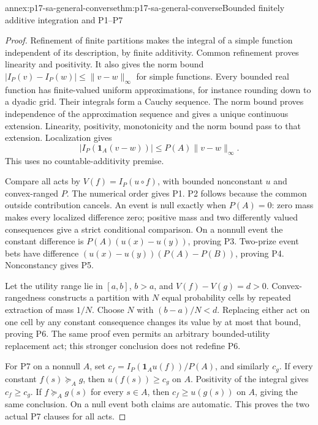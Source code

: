 \begin{annexitem}{annex:p17-sa-general-converse}{thm:p17-sa-general-converse}{Bounded finitely additive integration and P1--P7}
\begin{proof}
Refinement of finite partitions makes the integral of a simple
function independent of its description, by finite additivity.
Common refinement proves linearity and positivity.
It also gives the norm bound
\(|I_P(v)-I_P(w)|\leq\lVert v-w\rVert_\infty\) for simple
functions. Every bounded real function has finite-valued
uniform approximations, for instance rounding down to a
dyadic grid. Their integrals form a Cauchy sequence.
The norm bound proves independence of the approximation
sequence and gives a unique continuous extension.
Linearity, positivity, monotonicity and the norm bound
pass to that extension. Localization gives
\[
 |I_P(\mathbf1_A(v-w))|
 \leq P(A)\lVert v-w\rVert_\infty.
\]
This uses no countable-additivity premise.

Compare all acts by \(V(f)=I_P(u\circ f)\), with
bounded nonconstant \(u\) and convex-ranged \(P\).
The numerical order gives P1.
P2 follows because the common outside contribution cancels.
An event is null exactly when \(P(A)=0\):
zero mass makes every localized difference zero; positive
mass and two differently valued consequences give a strict
conditional comparison. On a nonnull event the constant
difference is \(P(A)(u(x)-u(y))\), proving P3.
Two-prize event bets have difference
\((u(x)-u(y))(P(A)-P(B))\), proving P4.
Nonconstancy gives P5.

Let the utility range lie in \([a,b]\), \(b>a\), and
\(V(f)-V(g)=d>0\).
Convex-rangedness constructs a partition with \(N\) equal
probability cells by repeated extraction of mass \(1/N\).
Choose \(N\) with \((b-a)/N<d\).
Replacing either act on one cell by any constant consequence
changes its value by at most that bound, proving P6.
The same proof even permits an arbitrary bounded-utility
replacement act; this stronger conclusion does not redefine P6.

For P7 on a nonnull \(A\), set
\(c_f=I_P(\mathbf1_Au(f))/P(A)\), and similarly \(c_g\).
If every constant \(f(s)\succeq_Ag\), then
\(u(f(s))\geq c_g\) on \(A\).
Positivity of the integral gives \(c_f\geq c_g\).
If \(f\succeq_Ag(s)\) for every \(s\in A\), then
\(c_f\geq u(g(s))\) on \(A\), giving the same conclusion.
On a null event both claims are automatic.
This proves the two actual P7 clauses for all acts.
\end{proof}
\end{annexitem}

